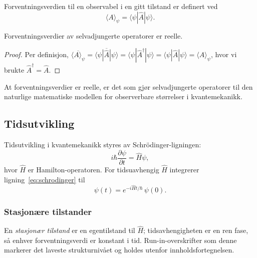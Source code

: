 \documentclass[a4paper,11pt]{article}
\begin{document}
Forventningsverdien til en observabel i en gitt tilstand er definert ved
\begin{equation}
  \langle A \rangle_\psi
  = \langle \psi | \hat{A} | \psi \rangle .
  \label{eq:forventning}
\end{equation}

\begin{hovedresultat}
\begin{teorem}
  Forventningsverdier av selvadjungerte operatorer er reelle.
\end{teorem}
\end{hovedresultat}

\begin{proof}
  Per definisjon, $\overline{\langle A \rangle_\psi}
  = \overline{\langle \psi | \hat{A} | \psi \rangle}
  = \langle \psi | \hat{A}^\dagger | \psi \rangle
  = \langle \psi | \hat{A} | \psi \rangle
  = \langle A \rangle_\psi$, hvor vi brukte $\hat{A}^\dagger = \hat{A}$.
\end{proof}

\begin{merknad}
  At forventningsverdier er reelle, er det som gjør selvadjungerte operatorer til den naturlige matematiske modellen for observerbare størrelser i kvantemekanikk.
\end{merknad}

\subsection{Tidsutvikling}

Tidsutvikling i kvantemekanikk styres av Schr\"odinger-ligningen:
\begin{equation}
  i\hbar \frac{\partial \psi}{\partial t}
  = \hat{H}\psi ,
  \label{eq:schrodinger}
\end{equation}
hvor $\hat{H}$ er Hamilton-operatoren. For tidsuavhengig $\hat{H}$ integrerer ligning~\eqref{eq:schrodinger} til
\begin{equation}
  \psi(t) = e^{-i\hat{H}t/\hbar}\,\psi(0).
\end{equation}

\subsubsection{Stasjonære tilstander}
En \emph{stasjonær tilstand} er en egentilstand til $\hat{H}$; tidsavhengigheten er en ren fase, så enhver forventningsverdi er konstant i tid. Run-in-overskrifter som denne markerer det laveste strukturnivået og holdes utenfor innholdsfortegnelsen.
\end{document}
